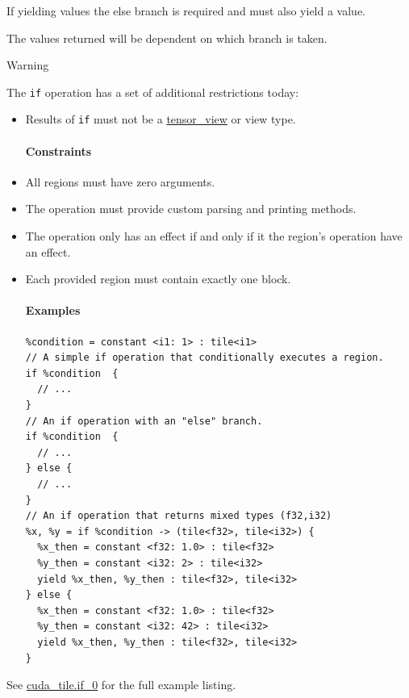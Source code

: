 \documentclass{article}
\begin{document}
If yielding values the else branch is required and must also yield a value.


The values returned will be dependent on which branch is taken.


Warning


The \texttt{if} operation has a set of additional restrictions today:


\begin{itemize}
\item Results of \texttt{if} must not be a \href{https://docs.nvidia.com/cuda/tile-ir/latest/sections/types.html#type-tensor-view}{tensor\_view} or view type.


\paragraph{Constraints}

\item All regions must have zero arguments.
\item The operation must provide custom parsing and printing methods.
\item The operation only has an effect if and only if it the region's operation have an effect.
\item Each provided region must contain exactly one block.


\paragraph{Examples}

\begin{lstlisting}
%condition = constant <i1: 1> : tile<i1>
// A simple if operation that conditionally executes a region.
if %condition  {
  // ...
}
// An if operation with an "else" branch.
if %condition  {
  // ...
} else {
  // ...
}
// An if operation that returns mixed types (f32,i32)
%x, %y = if %condition -> (tile<f32>, tile<i32>) {
  %x_then = constant <f32: 1.0> : tile<f32>
  %y_then = constant <i32: 2> : tile<i32>
  yield %x_then, %y_then : tile<f32>, tile<i32>
} else {
  %x_then = constant <f32: 1.0> : tile<f32>
  %y_then = constant <i32: 42> : tile<i32>
  yield %x_then, %y_then : tile<f32>, tile<i32>
}
\end{lstlisting}

\end{itemize}
See \href{https://docs.nvidia.com/cuda/tile-ir/latest/sections/appendix.html#example-cuda-tile-if-0}{cuda\_tile.if\_0} for the full example listing.
\end{document}
